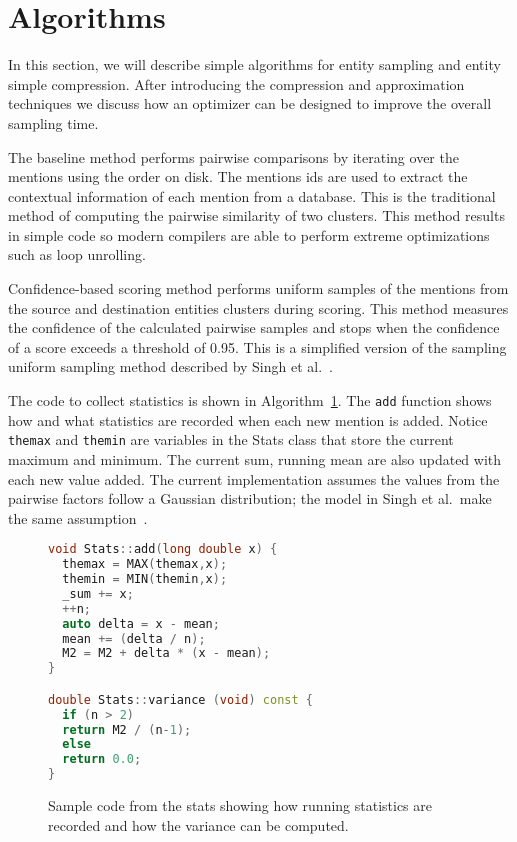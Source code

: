 

\section{Algorithms}
\label{sec:optimizer:algorithms}

In this section, we will describe simple algorithms for entity sampling and
entity simple compression.
After introducing the compression and approximation techniques we discuss how
an optimizer can be designed to improve the overall sampling time.

The baseline method performs pairwise comparisons by 
iterating over the mentions using the order on disk.
The mentions ids are used to extract the contextual information of each mention from a database.
This is the traditional method of computing the pairwise similarity of two clusters. 
This method results in simple code so modern compilers are able to perform extreme
optimizations such as loop unrolling.

Confidence-based scoring method performs uniform samples of the
mentions from the source and destination entities clusters during scoring. This method
measures the confidence of the calculated pairwise samples and stops when the
confidence of a score exceeds a threshold of 0.95.
This is a simplified version of the sampling uniform sampling method described by Singh et al.~\cite{singh2012monte}.

The code to collect statistics is shown in Algorithm~\ref{algo:stats}.
The \texttt{add} function shows how and what statistics are recorded when each new mention is added.
Notice \texttt{themax} and \texttt{themin} are variables in the Stats class that
store the current maximum and minimum.
The current sum, running mean are also updated with each new value added.
The current implementation assumes the values from the pairwise factors follow a Gaussian distribution;
the model in Singh et al.\ make the same assumption~\cite{singh2012monte}.

\begin{figure}
\centering
\begin{lstlisting}[language=c++,breaklines=true,keywordstyle=\color{blue},stringstyle=\color{red},commentstyle=\color{green}]
void Stats::add(long double x) {
  themax = MAX(themax,x);
  themin = MIN(themin,x);
  _sum += x;                   
  ++n;
  auto delta = x - mean;       
  mean += (delta / n);         
  M2 = M2 + delta * (x - mean);
} 

double Stats::variance (void) const {
  if (n > 2)  
  return M2 / (n-1);
  else
  return 0.0;
} 

\end{lstlisting}
\caption{Sample code from the stats showing how running statistics are recorded and how the variance can be computed.}
\label{algo:stats}
\end{figure}


